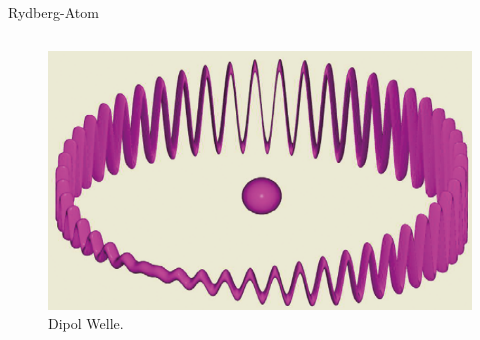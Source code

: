 \documentclass{beamer}
\begin{document}
\begin{frame}{Rydberg-Atom}
\begin{columns}
\begin{column}{0.5\textwidth}
\begin{figure}
				\center\includegraphics[width=.75\textwidth]{images/dipwave.png}
				\caption{Dipol Welle\cite{lect}.}
			\end{figure}
		\end{column}
	\end{columns}
\end{frame}
\end{document}

